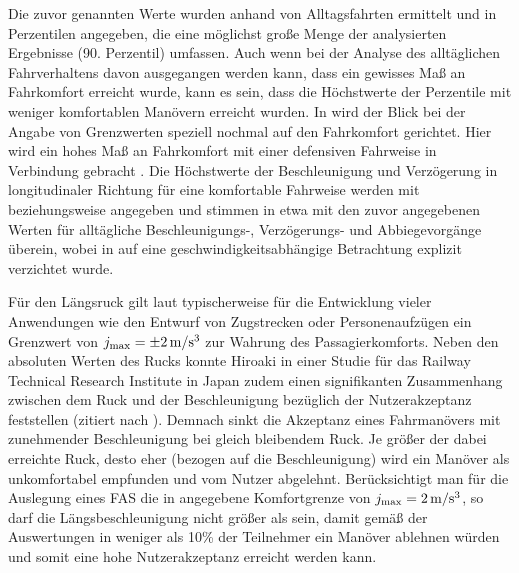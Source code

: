 Die zuvor genannten Werte wurden anhand von Alltagsfahrten ermittelt und in Perzentilen angegeben, die eine möglichst große Menge der analysierten Ergebnisse (90. Perzentil) umfassen. Auch wenn bei der Analyse des alltäglichen Fahrverhaltens davon ausgegangen werden kann, dass ein gewisses Maß an Fahrkomfort erreicht wurde, kann es sein, dass die Höchstwerte der Perzentile mit weniger komfortablen Manövern erreicht wurden. In \cite{Schwab} wird der Blick bei der Angabe von Grenzwerten speziell nochmal auf den Fahrkomfort gerichtet. Hier wird ein hohes Maß an Fahrkomfort mit einer defensiven Fahrweise in Verbindung gebracht \cite{Schwab}. Die Höchstwerte der Beschleunigung und Verzögerung in longitudinaler Richtung für eine komfortable Fahrweise werden mit  beziehungsweise  angegeben \cite{Schwab} und stimmen in etwa mit den zuvor angegebenen Werten für alltägliche Beschleunigungs-, Verzögerungs- und Abbiegevorgänge überein, wobei in \cite{Schwab} auf eine geschwindigkeitsabhängige Betrachtung explizit verzichtet wurde.

Für den Längsruck gilt laut \cite{Fun-to-Drive by Feedback} typischerweise für die Entwicklung vieler Anwendungen wie den Entwurf von Zugstrecken oder Personenaufzügen ein Grenzwert von $j_{\textrm{max}} = \pm2\,\mathrm{m/s^3}$ zur Wahrung des Passagierkomforts. Neben den absoluten Werten des Rucks konnte Hiroaki in einer Studie für das Railway Technical Research Institute in Japan zudem einen signifikanten Zusammenhang zwischen dem Ruck und der Beschleunigung bezüglich der Nutzerakzeptanz feststellen \cite{hiroaki} (zitiert nach \cite{powell}). Demnach sinkt die Akzeptanz eines Fahrmanövers mit zunehmender Beschleunigung bei gleich bleibendem Ruck. Je größer der dabei erreichte Ruck, desto eher (bezogen auf die Beschleunigung) wird ein Manöver als unkomfortabel empfunden und vom Nutzer abgelehnt. Berücksichtigt man für die Auslegung eines \gls{FAS} die in \cite{Fun-to-Drive by Feedback} angegebene Komfortgrenze von $j_{\textrm{max}} = 2\,\mathrm{m/s^3}$, so darf die Längsbeschleunigung nicht größer als  sein, damit gemäß der Auswertungen in \cite{hiroaki} weniger als 10\% der Teilnehmer ein Manöver ablehnen würden und somit eine hohe Nutzerakzeptanz erreicht werden kann.

